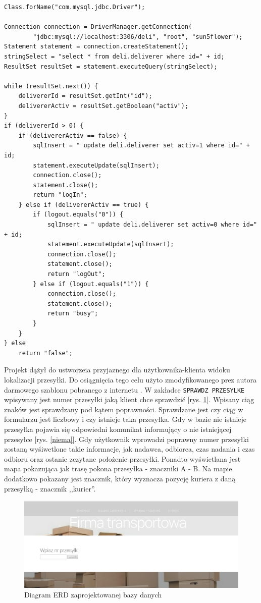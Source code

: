 \documentclass[eng,printmode,oneside]{mgr}
\begin{document}
\begin{lstlisting}[caption=Połączenia z bazą danych na przykładzie metody
sprawdzającej istnienie kuriera oraz jego stan
używanej przez aplikację mobilną,label=checkisexistsdeveloper]
Class.forName("com.mysql.jdbc.Driver");

Connection connection = DriverManager.getConnection(
		"jdbc:mysql://localhost:3306/deli", "root", "sun5flower");
Statement statement = connection.createStatement();
stringSelect = "select * from deli.deliverer where id=" + id;
ResultSet resultSet = statement.executeQuery(stringSelect);

while (resultSet.next()) {
	delivererId = resultSet.getInt("id");
	delivererActiv = resultSet.getBoolean("activ");
} 
if (delivererId > 0) {
	if (delivererActiv == false) {
		sqlInsert = " update deli.deliverer set activ=1 where id=" + id;
		statement.executeUpdate(sqlInsert);
		connection.close();
		statement.close();
		return "logIn";
	} else if (delivererActiv == true) {
		if (logout.equals("0")) {
			sqlInsert = " update deli.deliverer set activ=0 where id=" + id;
			statement.executeUpdate(sqlInsert);
			connection.close();
			statement.close();
			return "logOut";
		} else if (logout.equals("1")) {
			connection.close();
			statement.close();
			return "busy";
		}
	}
} else
	return "false";
\end{lstlisting}

Projekt dążył do ustworzeia przyjaznego dla użytkownika-klienta widoku
lokalizacji przesyłki. Do osiągnięcia tego celu użyto zmodyfikowanego prez
autora darmowego szablonu pobranego z internetu \cite{szablon}. W zakładce
\texttt{SPRAWDZ PRZESYLKE} wpisywany jest numer przesyłki jaką klient chce
sprawdzić [rys.
\ref{sprawdz}]. Wpisany ciąg znaków jest sprawdzany pod kątem poprawności.
Sprawdzane jest czy ciąg w formularzu jest liczbowy i czy istnieje taka
przesyłka. Gdy w bazie nie istnieje przesyłka pojawia się odpowiedni komunikat
informujący o nie istniejącej przesyłce [rys. \ref{niema}]. Gdy użytkownik
wprowadzi poprawny numer przesyłki zostaną wyśiwetlone takie informacje, jak
nadawca, odbiorca, czas nadania i czas odbioru oraz ostanie zczytane położenie
przesyłki. Ponadto wyświetlana jest mapa pokazująca jak trasę pokona przesyłka -
znaczniki A - B. Na mapie dodatkowo pokazany jest znacznik, który wyznacza
pozycję kuriera z daną przesyłką - znacznik ,,kurier''.

\begin{figure}[ht!]
\centering
\includegraphics[width=90ex]{sprawdz.png}
\caption{Diagram ERD zaprojektowanej bazy danych}
\label{sprawdz}
\end{figure}
\end{document}
